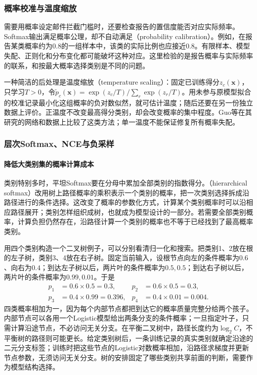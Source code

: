 \subsubsection{概率校准与温度缩放}

\label{sec:classification-probability-calibration}

需要用概率设定邮件拦截门槛时，还要检查报告的置信度能否对应实际频率。Softmax输出满足概率公理，却不自动满足（probability calibration）。例如，在报告某类概率约为$0.8$的一组样本中，该类的实际比例也应接近$0.8$。有限样本、模型失配、正则化和分布变化都可能破坏这种对应。这里检验的是报告概率与实际频率的联系，和按最大概率选择类别是不同的问题。

一种简洁的后处理是温度缩放（temperature scaling）：固定已训练得分$z_c(\bm x)$，只学习$T>0$，令$\tilde p_c(\bm x)=\exp(z_c/T)/\sum_r\exp(z_r/T)$。用未参与原模型拟合的校准记录最小化这组概率的负对数似然，就可估计温度；随后还要在另一份独立数据上评价。正温度不改变最高得分类别，却会改变概率的集中程度。Guo等在其研究的网络和数据上比较了这类方法；单一温度不能保证修复所有概率失配。

\subsubsection{层次Softmax、NCE与负采样}

\paragraph{降低大类别集的概率计算成本}
\label{sec:classification-softmax-hierarchical}

类别特别多时，平坦Softmax要在分母中累加全部类别的指数得分。（hierarchical softmax）改用树上路径概率的乘积表示一个类别的概率，把一次类别选择拆成沿路径进行的条件选择。这改变了概率的参数化方式，计算某个类别概率时可以沿相应路径展开；类别怎样组织成树，也就成为模型设计的一部分。若需要全部类别概率，计算负担仍然存在，沿路径计算一个类别的概率也不等于已经找到了最高概率类别。

用四个类别构造一个二叉树例子，可以分别看清归一化和搜索。把类别1、2放在根的左子树，类别3、4放在右子树。固定当前输入，设根节点向左的条件概率为$0.6$、向右为$0.4$；到达左子树以后，两片叶的条件概率为$0.5,0.5$；到达右子树以后，两片叶的条件概率为$0.99,0.01$。于是
\[
  \begin{aligned}
    p_1&=0.6\times0.5=0.3,&
    p_2&=0.6\times0.5=0.3,\\
    p_3&=0.4\times0.99=0.396,&
    p_4&=0.4\times0.01=0.004.
  \end{aligned}
\]
四类概率相加为一，因为每个内部节点都把到达它的概率质量完整分给两个孩子。内部节点可以各用一个Logistic模型给出两条分支的条件概率；一旦指定叶子，只需计算沿途节点，不必访问无关分支。在平衡二叉树中，路径长度约为$\log_2C$，不平衡树的路径则可能更长。给定类别树后，一条训练记录的真实类别就确定沿途的二元分支标签；训练时把这些节点的Logistic对数概率相加，沿路径求梯度并更新节点参数，无须访问无关分支。树的安排固定了哪些类别共享前面的判断，需要作为模型结构选择。

